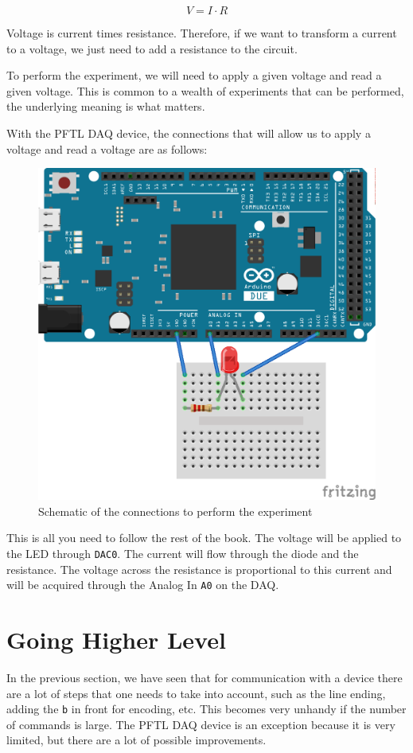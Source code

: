 \begin{equation}
V = I \cdot R
\end{equation}

Voltage is current times resistance. Therefore, if we want to transform a current to a voltage, we just need to add a resistance to the circuit.

To perform the experiment, we will need to apply a given voltage and read a given voltage. This is common to a wealth of experiments that can be performed, the underlying meaning is what matters.

With the {PFTL DAQ} device, the connections that will allow us to apply a voltage and read a voltage are as follows:

\begin{figure}
\includegraphics[width=.5\textwidth]{images/Chapter_03/IV_scheme_bb.png}
\caption{Schematic of the connections to perform the experiment}
\end{figure}

This is all you need to follow the rest of the book. The voltage will be applied to the LED through \texttt{DAC0}. The current will flow through the diode and the resistance. The voltage across the resistance is proportional to this current and will be acquired through the Analog In \texttt{A0} on the DAQ.


\section{Going Higher Level}\label{section:going-higher-level}
In the previous section, we have seen that for communication with a device there are a lot of steps that one needs to take into account, such as the
line ending, adding the \texttt{b} in front for encoding, etc. This becomes very unhandy if the number of commands is large. The {PFTL DAQ} device is an exception because it is very limited, but there are a lot of possible improvements.

